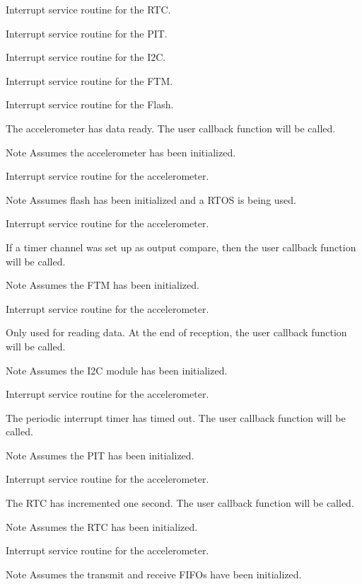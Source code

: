 Interrupt service routine for the R\+T\+C.

Interrupt service routine for the P\+I\+T.

Interrupt service routine for the I2\+C.

Interrupt service routine for the F\+T\+M.

Interrupt service routine for the Flash.

The accelerometer has data ready. The user callback function will be called. \begin{DoxyNote}{Note}
Assumes the accelerometer has been initialized.
\end{DoxyNote}
Interrupt service routine for the accelerometer.

\begin{DoxyNote}{Note}
Assumes flash has been initialized and a R\+T\+O\+S is being used.
\end{DoxyNote}
Interrupt service routine for the accelerometer.

If a timer channel was set up as output compare, then the user callback function will be called. \begin{DoxyNote}{Note}
Assumes the F\+T\+M has been initialized.
\end{DoxyNote}
Interrupt service routine for the accelerometer.

Only used for reading data. At the end of reception, the user callback function will be called. \begin{DoxyNote}{Note}
Assumes the I2\+C module has been initialized.
\end{DoxyNote}
Interrupt service routine for the accelerometer.

The periodic interrupt timer has timed out. The user callback function will be called. \begin{DoxyNote}{Note}
Assumes the P\+I\+T has been initialized.
\end{DoxyNote}
Interrupt service routine for the accelerometer.

The R\+T\+C has incremented one second. The user callback function will be called. \begin{DoxyNote}{Note}
Assumes the R\+T\+C has been initialized.
\end{DoxyNote}
Interrupt service routine for the accelerometer.

\begin{DoxyNote}{Note}
Assumes the transmit and receive F\+I\+F\+Os have been initialized. 
\end{DoxyNote}
